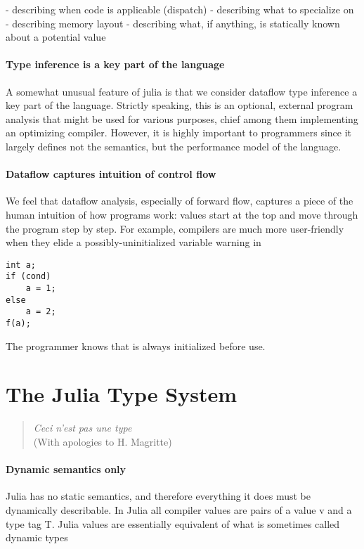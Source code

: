 \documentclass[pldi]{sigplanconf-pldi15}
\begin{document}
- describing when code is applicable (dispatch)
- describing what to specialize on
- describing memory layout
- describing what, if anything, is statically known about a potential value

\paragraph{Type inference is a key part of the language}
A somewhat unusual feature of julia is that we consider dataflow type inference a
key part of the language. Strictly speaking, this is an optional, external program
analysis that might be used for various purposes, chief among them implementing
an optimizing compiler. However, it is highly important to programmers since it
largely defines not the semantics, but the performance model of the language.

\paragraph{Dataflow captures intuition of control flow}
We feel that dataflow analysis, especially of forward flow, captures a piece of
the human intuition of how programs work: values start at the top and move through
the program step by step. For example, compilers are much more user-friendly
when they elide a possibly-uninitialized variable warning in

\begin{verbatim}
int a;
if (cond)
    a = 1;
else
    a = 2;
f(a);
\end{verbatim}

The programmer knows that  is always initialized before use.



\section{The Julia Type System}

\begin{quote}
  \textit{Ceci n'est pas une type} \\
  (With apologies to H. Magritte)
\end{quote}

\paragraph{Dynamic semantics only}
Julia has no static semantics, and therefore everything it does must be
dynamically describable.
In Julia all compiler values are pairs of a value v and a type tag T. Julia
values are essentially equivalent of what is sometimes called dynamic
types~\cite[Section 11.10, p. 142]{Pierce2002}
\end{document}

